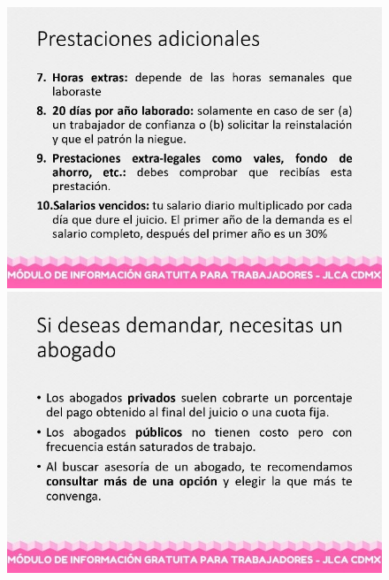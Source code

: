 \begin{figure}[H] 
  \centering
  \begin{minipage}[b]{0.45\textwidth}
    \includegraphics[width=\textwidth]{Figures/A2_7.jpg}
  \end{minipage}
  \begin{minipage}[b]{0.45\textwidth}
    \includegraphics[width=\textwidth]{Figures/A2_8.jpg}
  \end{minipage}
  \label{fig:A2_3_4}
\end{figure}
